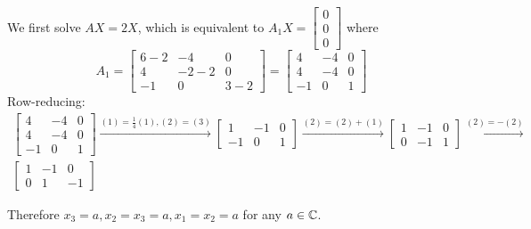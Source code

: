 \documentclass[a4paper, 11pt]{article}
\begin{document}
\begin{solution}
    We first solve \(AX = 2X\), which is equivalent to \(A_1X = \left[\begin{array}{c}
            0 \\
            0 \\
            0
        \end{array}\right]\) where \[
        A_1 = \left[\begin{array}{ccc}
                6 -2 & -4    & 0   \\
                4    & -2 -2 & 0   \\
                -1   & 0     & 3-2
            \end{array}\right] = \left[\begin{array}{ccc}
                4  & -4 & 0 \\
                4  & -4 & 0 \\
                -1 & 0  & 1
            \end{array}\right]
    \]
    Row-reducing:
    \begin{multline*}
        \left[\begin{array}{ccc}
                4  & -4 & 0 \\
                4  & -4 & 0 \\
                -1 & 0  & 1
            \end{array}\right] \xrightarrow{(1) = \frac{1}{4}(1),(2) = (3)}
        \left[\begin{array}{ccc}
                1  & -1 & 0 \\
                -1 & 0  & 1
            \end{array}\right] \xrightarrow{(2) = (2) + (1)}
        \left[\begin{array}{ccc}
                1 & -1 & 0 \\
                0 & -1 & 1
            \end{array}\right] \xrightarrow{(2) = -(2)}
        \\
        \left[\begin{array}{ccc}
                1 & -1 & 0  \\
                0 & 1  & -1
            \end{array}\right]
    \end{multline*}

    Therefore \(x_3 = a, x_2 = x_3 = a, x_1 = x_2 = a\) for any \(a \in \mathbb{C}\).


\end{solution}
\end{document}
